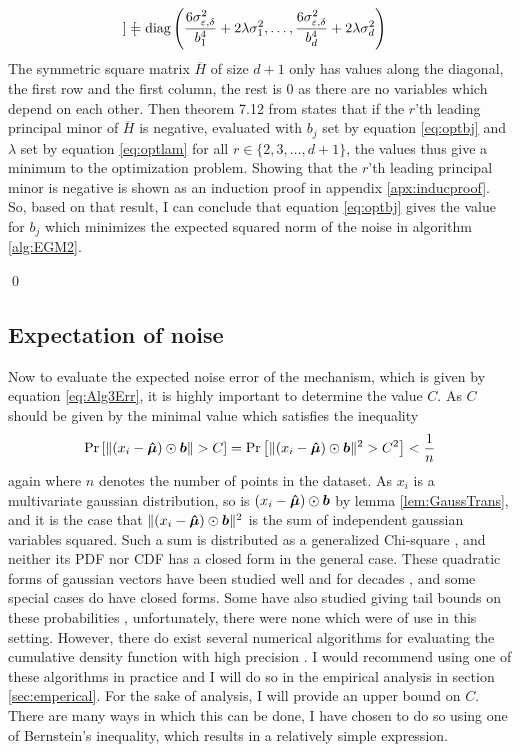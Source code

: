 \documentclass[a4paper,12pt]{article}
\renewenvironment{proof}{{\textit{Proof} \\}}{\qed}
\begin{document}
\begin{proof}
\begin{gather*}
\begin{bmatrix}
\end{bmatrix}
= \text{diag} \left (\frac{6\sigma_{\varepsilon, \delta}^2}{b_1^4} + 2\lambda\sigma_1^2, \dots, \frac{6\sigma_{\varepsilon, \delta}^2}{b_d^4} + 2\lambda\sigma_d^2 \right)
\end{gather*}
The symmetric square matrix $\overline{H}$ of size $d+1$ only has values along the diagonal, the first row
and the first column, the rest is $0$ as there are no variables which depend on each other.
Then theorem 7.12 from \cite{matrixcalc} states that if the $r$'th leading principal minor of $\overline{H}$ is negative,
evaluated with $b_j$ set by equation \eqref{eq:optbj} and $\lambda$ set by equation \eqref{eq:optlam}
for all $r \in \{2,3,\dots,d+1\}$, the values thus give a minimum to the optimization problem.
Showing that the $r$'th leading principal minor is negative is shown as an induction proof in
appendix \ref{apx:inducproof}. So, based on that result, I can conclude that equation \eqref{eq:optbj}
gives the value for $b_j$ which minimizes the expected squared norm of the noise in algorithm \ref{alg:EGM2}.

\end{proof}

\subsection{Expectation of noise}
Now to evaluate the expected noise error of the mechanism, which is given by equation \eqref{eq:Alg3Err}, it is highly important to determine the value $C$.
As $C$ should be given by the minimal value which satisfies the inequality
\[
   \Pr\left [ \| (x_i - \bm{\hat{\mu}}) \odot \bm{b} \| > C  \right] = \Pr\left [ \| (x_i - \bm{\hat{\mu}}) \odot \bm{b} \|^2 > C^2 \right] < \frac{1}{n}
\]
again where $n$ denotes the number of points in the dataset.
As $x_i$ is a multivariate gaussian distribution, so is $(x_i - \bm{\hat{\mu}}) \odot \bm{b}$ by lemma \ref{lem:GaussTrans},
and it is the case that $\|(x_i - \bm{\hat{\mu}}) \odot \bm{b}\|^2$ is the sum of independent gaussian variables squared.
Such a sum is distributed as a generalized Chi-square \cite{GenChiSq}, and neither its PDF nor CDF has a closed form in the general case.
These quadratic forms of gaussian vectors have been studied well and for decades \cite{MathaiQaudForms,IowaQuadNormForms}, and some special cases do have closed forms.
Some have also studied giving tail bounds on these probabilities \cite{QaudFormsBounds}, unfortunately, there were none which were of use in this setting.
However, there do exist several numerical algorithms for evaluating the cumulative density function with high precision \cite{QuadFormsNume}. 
I would recommend using one of these algorithms in practice and I will do so in the empirical analysis in section \ref{sec:emperical}.
For the sake of analysis, I will provide an upper bound on $C$. There are many ways in which this can be done,
I have chosen to do so using one of Bernstein's inequality, which results in a relatively simple expression.
\end{document}
